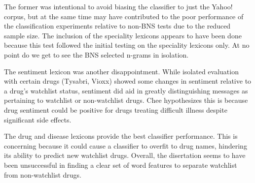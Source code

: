 \documentclass[twoside,11pt]{article}
\begin{document}
The former was intentional to avoid biasing the classifier to just the Yahoo! corpus, but at the same time may have contributed to the poor performance of the classification experiments relative to non-BNS tests due to the reduced sample size. The inclusion of the speciality lexicons appears to have been done because this test followed the initial testing on the speciality lexicons only. At no point do we get to see the BNS selected n-grams in isolation.

The sentiment lexicon was another disappointment. While isolated evaluation with certain drugs (Tysabri, Vioxx) showed some changes in sentiment relative to a drug's watchlist status, sentiment did aid in greatly distinguishing messages as pertaining to watchlist or non-watchlist drugs. Chee hypothesizes this is because drug sentiment could be positive for drugs treating difficult illness despite significant side effects.

The drug and disease lexicons provide the best classifier performance. This is concerning because it could cause a classifier to overfit to drug names, hindering its ability to predict new watchlist drugs. Overall, the disertation seems to have been unsuccessful in finding a clear set of word features to separate watchlist from non-watchlist drugs.
\end{document}
